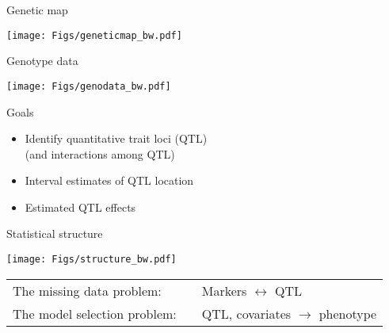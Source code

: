 \documentclass[12pt]{article}
\newcommand{\headsize}{\fontsize{35}{35} \selectfont}
\newcommand{\smallsize}{\fontsize{25}{30} \selectfont}
\newcommand{\smallersize}{\fontsize{20}{25} \selectfont}
\begin{document}
\newpage

\headsize \color{myyellow}
\hfill \begin{minipage}{5.75in}
\centering
Genetic map
\end{minipage}

\vfill

\centerline{\texttt{[image: Figs/geneticmap\_bw.pdf]}}

\newpage

\headsize \color{myyellow}
\hfill \begin{minipage}{5.75in}
\centering
Genotype data
\end{minipage}

\vfill

\centerline{\texttt{[image: Figs/genodata\_bw.pdf]}}


\newpage

\headsize \color{myyellow}
\hfill \begin{minipage}{5.75in}
\centering
Goals
\end{minipage}

\vspace{3cm}

\color{mywhite} \smallsize

\hfill \begin{minipage}[t]{9.5in}
\begin{itemize}
\itemsep24pt
\item Identify quantitative trait loci (QTL)\\[6pt]
   {\color{myblue}   (and interactions among QTL)}
\item Interval estimates of QTL location
\item Estimated QTL effects
\end{itemize} \end{minipage}


\newpage

\headsize \color{myyellow}
\hfill \begin{minipage}{5.75in}
\centering
Statistical structure
\end{minipage}

\vspace{2cm} \color{mywhite} \smallersize

\centerline{\texttt{[image: Figs/structure\_bw.pdf]}}

\vspace{15mm}

\hspace*{3cm}\begin{tabular}{lll}
{\color{mypink} The missing data problem:}  & \hspace{15mm} &
Markers $\longleftrightarrow$ QTL \\[15mm]

{\color{mypink} The model selection problem:}
& & QTL, covariates $\longrightarrow$ phenotype
\end{tabular}
\end{document}

